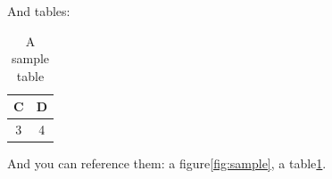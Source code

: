 And tables:
\begin{table}[H]
	\centering
	\begin{tabular}{|c|c|}
		\hline
		C & D \\ \hline
		3 & 4 \\ \hline
	\end{tabular}
	\caption{A sample table}
	\label{tab:sample}
\end{table}

And you can reference them: a figure\ref{fig:sample}, a table\ref{tab:sample}.


